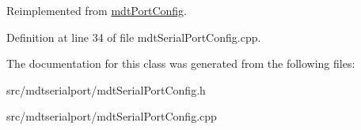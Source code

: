 Reimplemented from \hyperlink{classmdt_port_config_a1cad2f21252411977fe328f89b68fbfb}{mdtPortConfig}.



Definition at line 34 of file mdtSerialPortConfig.cpp.



The documentation for this class was generated from the following files:\begin{DoxyCompactItemize}
\item 
src/mdtserialport/mdtSerialPortConfig.h\item 
src/mdtserialport/mdtSerialPortConfig.cpp\end{DoxyCompactItemize}
